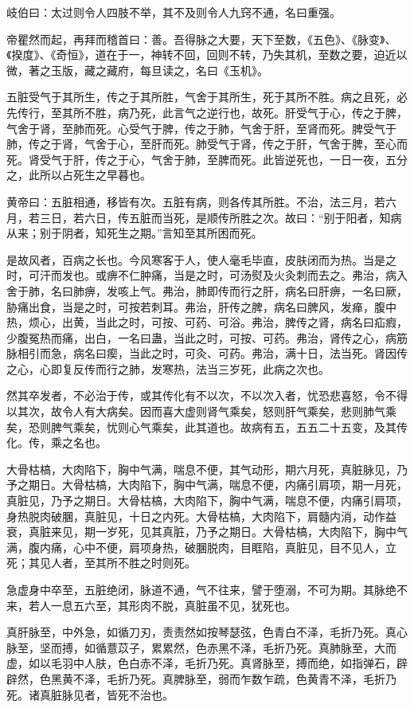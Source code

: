 \documentclass{article}%
\begin{document}
岐伯曰：太过则令人四肢不举，其不及则令人九窍不通，名曰重强。

帝瞿然而起，再拜而稽首曰：善。吾得脉之大要，天下至数，《五色》、《脉变》、《揆度》、《奇恒》，道在于一，神转不回，回则不转，乃失其机，至数之要，迫近以微，著之玉版，藏之藏府，每旦读之，名曰《玉机》。

五脏受气于其所生，传之于其所胜，气舍于其所生，死于其所不胜。病之且死，必先传行，至其所不胜，病乃死，此言气之逆行也，故死。肝受气于心，传之于脾，气舍于肾，至肺而死。心受气于脾，传之于肺，气舍于肝，至肾而死。脾受气于肺，传之于肾，气舍于心，至肝而死。肺受气于肾，传之于肝，气舍于脾，至心而死。肾受气于肝，传之于心，气舍于肺，至脾而死。此皆逆死也，一日一夜，五分之，此所以占死生之早暮也。

黄帝曰：五脏相通，移皆有次。五脏有病，则各传其所胜。不治，法三月，若六月，若三日，若六日，传五脏而当死，是顺传所胜之次。故曰：“别于阳者，知病从来；别于阴者，知死生之期。”言知至其所困而死。

是故风者，百病之长也。今风寒客于人，使人毫毛毕直，皮肤闭而为热。当是之时，可汗而发也。或痹不仁肿痛，当是之时，可汤熨及火灸刺而去之。弗治，病入舍于肺，名曰肺痹，发咳上气。弗治，肺即传而行之肝，病名曰肝痹，一名曰厥，胁痛出食，当是之时，可按若刺耳。弗治，肝传之脾，病名曰脾风，发瘅，腹中热，烦心，出黄，当此之时，可按、可药、可浴。弗治，脾传之肾，病名曰疝瘕，少腹冤热而痛，出白，一名曰蛊，当此之时，可按、可药。弗治，肾传之心，病筋脉相引而急，病名曰瘈，当此之时，可灸、可药。弗治，满十日，法当死。肾因传之心，心即复反传而行之肺，发寒热，法当三岁死，此病之次也。

然其卒发者，不必治于传，或其传化有不以次，不以次入者，忧恐悲喜怒，令不得以其次，故令人有大病矣。因而喜大虚则肾气乘矣，怒则肝气乘矣，悲则肺气乘矣，恐则脾气乘矣，忧则心气乘矣，此其道也。故病有五，五五二十五变，及其传化。传，乘之名也。

大骨枯槁，大肉陷下，胸中气满，喘息不便，其气动形，期六月死，真脏脉见，乃予之期日。大骨枯槁，大肉陷下，胸中气满，喘息不便，内痛引肩项，期一月死，真脏见，乃予之期日。大骨枯槁，大肉陷下，胸中气满，喘息不便，内痛引肩项，身热脱肉破䐃，真脏见，十日之内死。大骨枯槁，大肉陷下，肩髓内消，动作益衰，真脏来见，期一岁死，见其真脏，乃予之期日。大骨枯槁，大肉陷下，胸中气满，腹内痛，心中不便，肩项身热，破䐃脱肉，目眶陷，真脏见，目不见人，立死；其见人者，至其所不胜之时则死。

急虚身中卒至，五脏绝闭，脉道不通，气不往来，譬于堕溺，不可为期。其脉绝不来，若人一息五六至，其形肉不脱，真脏虽不见，犹死也。

真肝脉至，中外急，如循刀刃，责责然如按琴瑟弦，色青白不泽，毛折乃死。真心脉至，坚而搏，如循薏苡子，累累然，色赤黑不泽，毛折乃死。真肺脉至，大而虚，如以毛羽中人肤，色白赤不泽，毛折乃死。真肾脉至，搏而绝，如指弹石，辟辟然，色黑黄不泽，毛折乃死。真脾脉至，弱而乍数乍疏，色黄青不泽，毛折乃死。诸真脏脉见者，皆死不治也。
\end{document}
